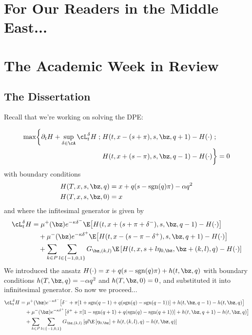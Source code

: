 \documentclass[12pt]{article}
\begin{document}
\newpage

\section*{For Our Readers in the Middle East...}


\section*{The Academic Week in Review}

\subsection*{The Dissertation}
Recall that we're working on solving the DPE:

\begin{equation}\label{eq:DPEmaxprofit}
\begin{split}
\max \biggl\lbrace \partial_t H + \sup \limits_{\delta \in \cA} \cL^{\delta}_t H \; ; \; & H(t,x-(s+\pi), s, \bz, q+1) - H(\cdot) \; ; \\
&  H(t,x+(s-\pi), s, \bz, q-1) - H(\cdot) \biggr\rbrace = 0
\end{split}
\end{equation}
with boundary conditions
\begin{align}
H(T, x, s, \bz, q) & = x + q(s - \mathrm{sgn}(q)\pi) - \alpha q^2 \\
H(T, x, s, \bz, 0) & = x
\end{align}
and where the infitesimal generator is given by
\begin{equation}
\label{eq:infgen}
\begin{split}
\cL^{\delta}_t H & = \mu^+(\bz) e^{ -\kappa \delta^{-}} \E \bigl[ H(t,x+(s+\pi+\delta^-),s,\bz,q-1) - H(\cdot) \bigr] \\
& \quad + \mu^-(\bz) e^{ -\kappa \delta^{+}} \E \bigl[ H(t,x-(s-\pi-\delta^+),s,\bz,q+1) - H(\cdot) \bigr] \\
& \quad + \sum_{k\in P} \sum_{l \in \{-1,0,1\}} G_{\bz,(k,l)} \E \left[ H(t,x,s+l\eta_{0,\bz},\bz+(k,l),q) - H(\cdot) \right] 
\end{split}
\end{equation}
We introduced the ansatz $H(\cdot) = x + q(s - \mathrm{sgn}(q)\pi) + h(t,\bz,q)$ with boundary conditions $h(T, \bz, q)  = - \alpha q^2$ and $h(T, \bz, 0)  = 0$, and substituted it into infinitesimal generator. So now we proceed...
\begin{align*}
\cL^{\delta}_t H & = \mu^+(\bz) e^{ -\kappa \delta^{-}} \bigl[ \delta^- + \pi [ 1 + \mathrm{sgn}(q-1) + q(\mathrm{sgn}(q) - \mathrm{sgn}(q-1) ) ] + h(t,\bz,q-1) - h(t,\bz,q) \bigr] \\
& \quad + \mu^-(\bz) e^{ -\kappa \delta^{+}} \bigl[ \delta^+ + \pi [ 1 - \mathrm{sgn}(q+1) + q(\mathrm{sgn}(q) - \mathrm{sgn}(q+1) ) ] + h(t,\bz,q+1) - h(t,\bz,q) \bigr] \\
& \quad + \sum_{k\in P} \sum_{l \in \{-1,0,1\}} G_{\bz,(k,l)} \left[ ql \E \left[ \eta_{0,\bz} \right] + h(t,(k,l),q) - h(t,\bz,q) \right] 
\end{align*}
\end{document}
